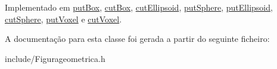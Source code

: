 Implementado em \hyperlink{classput_box_afd85072811169fc9f25435de046a101e}{put\+Box}, \hyperlink{classcut_box_ab71dd9780aace3726f8c2225938c47c2}{cut\+Box}, \hyperlink{classcut_ellipsoid_aa93a018312690a4f61fc13134f84bebc}{cut\+Ellipsoid}, \hyperlink{classput_sphere_addd9a9936084a1f83bd22973c6e3da16}{put\+Sphere}, \hyperlink{classput_ellipsoid_a392bfa08917d452add21c19339d15e2c}{put\+Ellipsoid}, \hyperlink{classcut_sphere_a98c142b869487cc6a0531f6bfca8462a}{cut\+Sphere}, \hyperlink{classput_voxel_a39ae3ee4db405543234953f503201429}{put\+Voxel} e \hyperlink{classcut_voxel_aaabe3257d363e6f8abff1dc5f2632550}{cut\+Voxel}.



A documentação para esta classe foi gerada a partir do seguinte ficheiro\+:\begin{DoxyCompactItemize}
\item 
include/Figurageometrica.\+h\end{DoxyCompactItemize}
